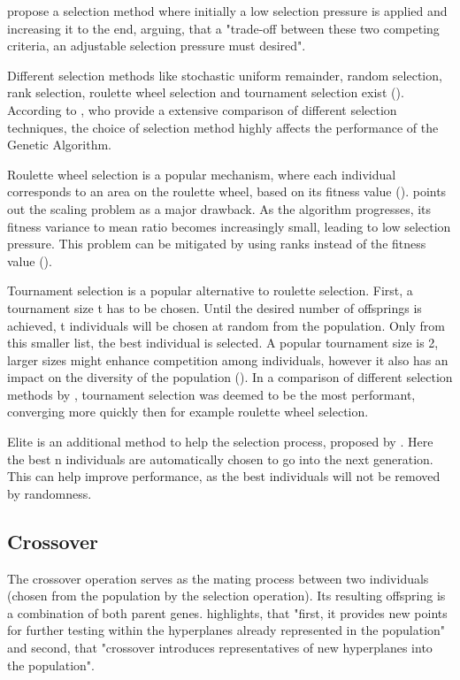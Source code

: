 \cite{hussain_trade-off_2020} propose a selection method where initially a low selection pressure is applied and increasing it to the end, arguing, that a "trade-off between these two competing criteria, an adjustable selection pressure must desired".

Different selection methods like stochastic uniform remainder, random selection, rank selection, roulette wheel selection and tournament selection exist (\cite{majumdar_genetic_2015}). According to \cite{hussain_trade-off_2020}, who provide a extensive comparison of different selection techniques, the choice of selection method highly affects the performance of the Genetic Algorithm.

Roulette wheel selection is a popular mechanism, where each individual corresponds to an area on the roulette wheel, based on its fitness value (). \cite{grefenstette_optimization_1986} points out the scaling problem as a major drawback. As the algorithm progresses, its fitness variance to mean ratio becomes increasingly small, leading to low selection pressure.
This problem can be mitigated by using ranks instead of the fitness value (\cite{katoch_review_2021}).

Tournament selection is a popular alternative to roulette selection. First, a tournament size t has to be chosen. Until the desired number of offsprings is achieved, t individuals will be chosen at random from the population. Only from this smaller list, the best individual is selected. A popular tournament size is 2, larger sizes might enhance competition among individuals, however it also has an impact on the diversity of the population (\cite{hussain_trade-off_2020}). In a comparison of different selection methods by \cite{jinghui_zhong_comparison_2005}, tournament selection was deemed to be the most performant, converging more quickly then for example roulette wheel selection.

Elite is an additional method to help the selection process, proposed by \cite{de_jong_analysis_1975}. Here the best n individuals are automatically chosen to go into the next generation. This can help improve performance, as the best individuals will not be removed by randomness.

\subsection{Crossover}
The crossover operation serves as the mating process between two individuals (chosen from the population by the selection operation). Its resulting offspring is a combination of both parent genes. \cite{grefenstette_optimization_1986} highlights, that "first, it provides new points for further testing within the hyperplanes already represented in the population" and second, that "crossover introduces representatives of new hyperplanes into the population". 


